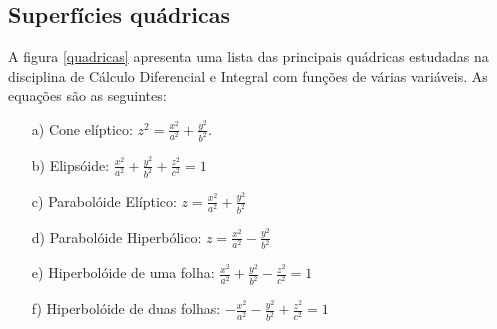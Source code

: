\subsection{Superfícies quádricas}
A figura \ref{quadricas} apresenta uma lista das principais quádricas estudadas na disciplina de Cálculo Diferencial e Integral com funções de várias variáveis. As equações são as seguintes:
\begin{itemize}
\item[a)] Cone elíptico: $\displaystyle z^2=\frac{x^2}{a^2}+\frac{y^2}{b^2}$.
\item[b)] Elipsóide: $\displaystyle \frac{x^2}{a^2}+\frac{y^2}{b^2}+\frac{z^2}{c^2}=1$
\item[c)] Parabolóide Elíptico: $\displaystyle z=\frac{x^2}{a^2}+\frac{y^2}{b^2}$
\item[d)] Parabolóide Hiperbólico: $\displaystyle z=\frac{x^2}{a^2}-\frac{y^2}{b^2}$
\item[e)] Hiperbolóide de uma folha: $\displaystyle \frac{x^2}{a^2}+\frac{y^2}{b^2}-\frac{z^2}{c^2}=1$
\item[f)] Hiperbolóide de duas folhas:  $\displaystyle -\frac{x^2}{a^2}-\frac{y^2}{b^2}+\frac{z^2}{c^2}=1$
\end{itemize}
